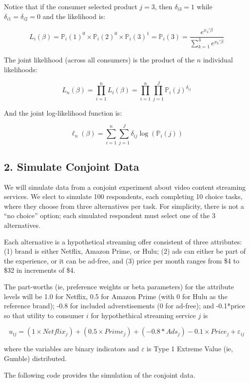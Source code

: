 \documentclass[
  letterpaper,
  DIV=11,
  numbers=noendperiod]{scrartcl}
\begin{document}
Notice that if the consumer selected product \(j=3\), then
\(\delta_{i3}=1\) while \(\delta_{i1}=\delta_{i2}=0\) and the likelihood
is:

\[ L_i(\beta) = \mathbb{P}_i(1)^0 \times \mathbb{P}_i(2)^0 \times \mathbb{P}_i(3)^1 = \mathbb{P}_i(3) = \frac{e^{x_3'\beta}}{\sum_{k=1}^3e^{x_k'\beta}} \]

The joint likelihood (across all consumers) is the product of the \(n\)
individual likelihoods:

\[ L_n(\beta) = \prod_{i=1}^n L_i(\beta) = \prod_{i=1}^n \prod_{j=1}^J \mathbb{P}_i(j)^{\delta_{ij}} \]

And the joint log-likelihood function is:

\[ \ell_n(\beta) = \sum_{i=1}^n \sum_{j=1}^J \delta_{ij} \log(\mathbb{P}_i(j)) \]

\subsection{2. Simulate Conjoint Data}\label{simulate-conjoint-data}

We will simulate data from a conjoint experiment about video content
streaming services. We elect to simulate 100 respondents, each
completing 10 choice tasks, where they choose from three alternatives
per task. For simplicity, there is not a ``no choice'' option; each
simulated respondent must select one of the 3 alternatives.

Each alternative is a hypothetical streaming offer consistent of three
attributes: (1) brand is either Netflix, Amazon Prime, or Hulu; (2) ads
can either be part of the experience, or it can be ad-free, and (3)
price per month ranges from \$4 to \$32 in increments of \$4.

The part-worths (ie, preference weights or beta parameters) for the
attribute levels will be 1.0 for Netflix, 0.5 for Amazon Prime (with 0
for Hulu as the reference brand); -0.8 for included adverstisements (0
for ad-free); and -0.1*price so that utility to consumer \(i\) for
hypothethical streaming service \(j\) is

\[
u_{ij} = (1 \times Netflix_j) + (0.5 \times Prime_j) + (-0.8*Ads_j) - 0.1\times Price_j + \varepsilon_{ij}
\]

where the variables are binary indicators and \(\varepsilon\) is Type 1
Extreme Value (ie, Gumble) distributed.

The following code provides the simulation of the conjoint data.
\end{document}
